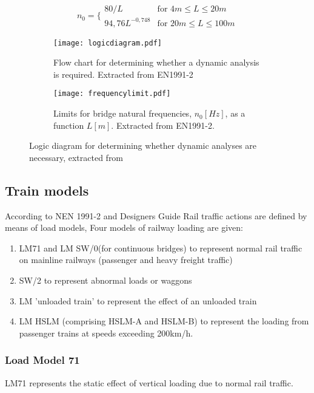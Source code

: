 \begin{equation}
	n_0= \{ \begin{array}{ll}
	80/L & \mbox{for $4m\leq L \leq 20m$} \\
	94,76L^{-0,748} & \mbox{for $20m\leq L \leq 100m$}
\end{array} 
\end{equation}

\begin{figure}[h]
\centering
	\begin{subfigure}[b]{0.45\textwidth}
    	\centering
    	\texttt{[image: logicdiagram.pdf]}
    	\caption{Flow chart for determining whether a dynamic analysis is required. Extracted from EN1991-2\cite{EC12}}
    	\label{fig:logicdiagram}
	\end{subfigure}
	\begin{subfigure}[b]{0.45\textwidth}
    	\texttt{[image: frequencylimit.pdf]}
    	\caption{Limits for bridge natural frequencies, $n_0 [Hz]$, as a function $L [m]$. Extracted from EN1991-2\cite{EC12}.}
    	\label{fig:frequencylimit}
	\end{subfigure}
\caption{Logic diagram for determining whether dynamic analyses are necessary, extracted from \cite[6.4.4]{EC12}}
\label{logicandlimit}
\end{figure}

\subsection{Train models}\label{sec:train-models}
According to NEN 1991-2\cite{EC12} and Designers Guide\cite{calgaro2010designers} Rail traffic actions are defined by means of load models, Four models of railway loading are given:
\begin{enumerate}[$\bullet$]
	\item LM71 and LM SW/0(for continuous bridges) to represent normal rail traffic on mainline railways (passenger and heavy freight traffic)
	\item SW/2 to represent abnormal loads or waggons
	\item LM 'unloaded train' to represent the effect of an unloaded train
	\item LM HSLM (comprising HSLM-A and HSLM-B) to represent the loading from passenger trains at speeds exceeding 200km/h.
\end{enumerate}

\subsubsection{Load Model 71}
LM71 represents the static effect of vertical loading due to normal rail traffic.

